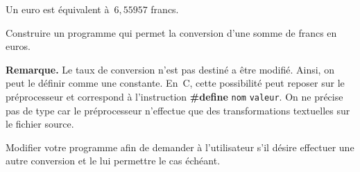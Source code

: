\begin{exercice}
  Un euro est \'equivalent \`a~$6,55957$ francs.
  \par
  Construire  un  programme qui  permet la  conversion  d'une somme de
  francs en euros.
  \par
  \textbf{Remarque.}  Le taux   de  conversion n'est pas  destin\'e  a
  \^etre  modifi\'e. Ainsi, on peut  le d\'efinir comme une constante. 
  En~C,  cette possibilit\'e  peut reposer  sur  le pr\'eprocesseur et
  correspond    \`a  l'instruction  \textbf{\#{}define}   \texttt{nom}
  \texttt{valeur}.  On ne pr\'ecise pas de type car le pr\'eprocesseur
  n'effectue que des transformations textuelles sur le fichier source.
  \par
  Modifier   votre programme afin de   demander \`a l'utilisateur s'il
  d\'esire effectuer une autre conversion  et le lui permettre le  cas
  \'ech\'eant.
  \ifcorrection
  \begin{correction}
    
  \end{correction}
  \fi
\end{exercice}
